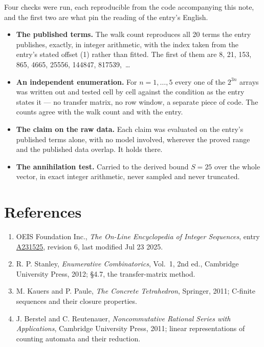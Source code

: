 \documentclass[11pt]{article}
\theoremstyle{definition}
\begin{document}
Four checks were run, each reproducible from the code accompanying this note, and the first two are what pin the reading of the entry's English.

\begin{itemize}

\item {\bfseries The published terms.} The walk count reproduces all 20 terms the entry publishes, exactly, in integer arithmetic, with the index taken from the entry's stated offset (1) rather than fitted. The first of them are 8, 21, 153, 865, 4665, 25556, 144847, 817539,~\dots

\item {\bfseries An independent enumeration.} For $n = 1,\dots,5$ every one of the $2^{3n}$ arrays was written out and tested cell by cell against the condition as the entry states it --- no transfer matrix, no row window, a separate piece of code. The counts agree with the walk count and with the entry.

\item {\bfseries The claim on the raw data.} Each claim was evaluated on the entry's published terms alone, with no model involved, wherever the proved range and the published data overlap. It holds there.

\item {\bfseries The annihilation test.} Carried to the derived bound $S = 25$ over the whole vector, in exact integer arithmetic, never sampled and never truncated.

\end{itemize}

\section{References}

\begin{enumerate}

\item OEIS Foundation Inc., \emph{The On-Line Encyclopedia of Integer Sequences}, entry \href{https://oeis.org/A231525}{A231525}, revision 6, last modified Jul 23 2025.

\item R. P. Stanley, \emph{Enumerative Combinatorics}, Vol.~1, 2nd ed., Cambridge University Press, 2012; \S4.7, the transfer-matrix method.

\item M. Kauers and P. Paule, \emph{The Concrete Tetrahedron}, Springer, 2011; C-finite sequences and their closure properties.

\item J. Berstel and C. Reutenauer, \emph{Noncommutative Rational Series with Applications}, Cambridge University Press, 2011; linear representations of counting automata and their reduction.

\end{enumerate}
\end{document}

